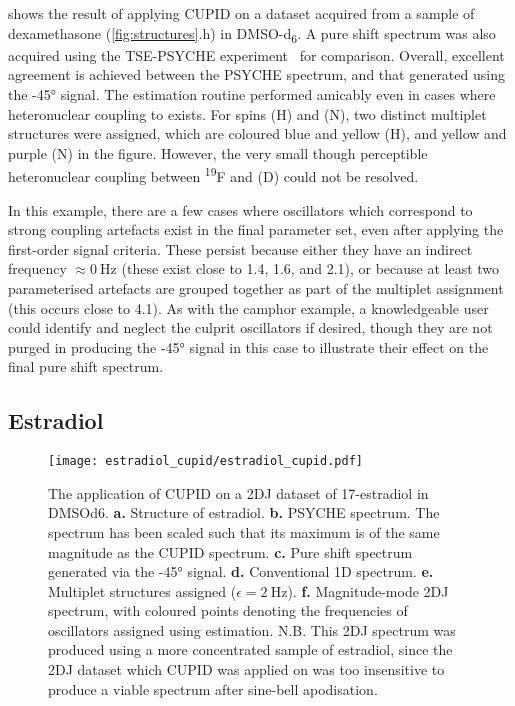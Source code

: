  shows the result of applying CUPID on a
dataset acquired from a sample of dexamethasone (\cref{fig:structures}.h) in
DMSO-d\textsubscript{6}. A
pure shift spectrum was also acquired using the
\ac{TSE-PSYCHE} experiment~\cite{Foroozandeh2018,Foroozandeh2015} for
comparison.
Overall, excellent agreement is achieved between the \ac{PSYCHE}
spectrum, and that generated using the \ang{-45} signal. The estimation routine
performed amicably even in cases where heteronuclear coupling to
 exists. For spins (H) and (N), two distinct
multiplet structures were assigned, which are coloured blue and yellow (H), and
yellow and purple (N) in the figure. However, the very small though perceptible
heteronuclear coupling between \textsuperscript{19}F and (D) could not be
resolved.

In this example, there are a few cases where oscillators which correspond to
strong coupling artefacts exist in the final parameter set, even after applying
the first-order signal criteria. These persist because either they have an
indirect frequency
$\approx \qty{0}{\hertz}$ (these exist close to
\qty{1.4}{\partspermillion}, \qty{1.6}{\partspermillion}, and
\qty{2.1}{\partspermillion}), or because at
least two parameterised artefacts are grouped together as part of the multiplet
assignment (this occurs close to \qty{4.1}{\partspermillion}). As with the
camphor example, a knowledgeable user could identify and neglect the culprit
oscillators if desired, though they are not purged in producing the \ang{-45}
signal in this case to illustrate their effect on the final pure shift spectrum.

\subsection{Estradiol}
\begin{figure}
    \texttt{[image: estradiol\_cupid/estradiol\_cupid.pdf]}%
    \caption[
        The application of \acs{CUPID} on a 17\textbeta-estradiol \acs{2DJ}
        dataset.
    ]{
        The application of \acs{CUPID} on a \ac{2DJ} dataset of 17\textbeta-estradiol
        in \acs{DMSOd6}.
        \textbf{a.} Structure of estradiol.
        \textbf{b.} \acs{PSYCHE} spectrum.
        The spectrum has been scaled such that its maximum is of the same
        magnitude as the \acs{CUPID} spectrum.
        \textbf{c.} Pure shift spectrum generated via the \ang{-45} signal.
        \textbf{d.} Conventional \ac{1D} spectrum.
        \textbf{e.} Multiplet structures assigned ($\epsilon =
        \qty{2}{\hertz}$).
        \textbf{f.} Magnitude-mode \ac{2DJ} spectrum, with coloured points
        denoting the frequencies of oscillators assigned using estimation.
        N.B. This \ac{2DJ} spectrum was produced using a more
        concentrated sample of estradiol, since the \ac{2DJ} dataset which
        \ac{CUPID} was applied on was too insensitive to produce a viable
        spectrum after sine-bell apodisation.
    }
    \label{fig:estradiol-cupid}%
\end{figure}

